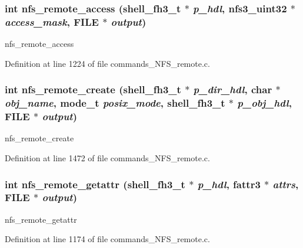 \subsubsection[{nfs\_\-remote\_\-access}]{\setlength{\rightskip}{0pt plus 5cm}int nfs\_\-remote\_\-access ({\bf shell\_\-fh3\_\-t} $\ast$ {\em p\_\-hdl}, \/  nfs3\_\-uint32 $\ast$ {\em access\_\-mask}, \/  FILE $\ast$ {\em output})}\label{commands__NFS__remote_8c_ae38d72f87964f3cf6d732a64ebb8df6}


nfs\_\-remote\_\-access 

Definition at line 1224 of file commands\_\-NFS\_\-remote.c.
\subsubsection[{nfs\_\-remote\_\-create}]{\setlength{\rightskip}{0pt plus 5cm}int nfs\_\-remote\_\-create ({\bf shell\_\-fh3\_\-t} $\ast$ {\em p\_\-dir\_\-hdl}, \/  char $\ast$ {\em obj\_\-name}, \/  mode\_\-t {\em posix\_\-mode}, \/  {\bf shell\_\-fh3\_\-t} $\ast$ {\em p\_\-obj\_\-hdl}, \/  FILE $\ast$ {\em output})}\label{commands__NFS__remote_8c_1cdae20f2c9bb93403fdf1e0614f4229}


nfs\_\-remote\_\-create 

Definition at line 1472 of file commands\_\-NFS\_\-remote.c.
\subsubsection[{nfs\_\-remote\_\-getattr}]{\setlength{\rightskip}{0pt plus 5cm}int nfs\_\-remote\_\-getattr ({\bf shell\_\-fh3\_\-t} $\ast$ {\em p\_\-hdl}, \/  fattr3 $\ast$ {\em attrs}, \/  FILE $\ast$ {\em output})}\label{commands__NFS__remote_8c_bb200fa0f0b703c4a203f6c1bd08ec62}


nfs\_\-remote\_\-getattr 

Definition at line 1174 of file commands\_\-NFS\_\-remote.c.

